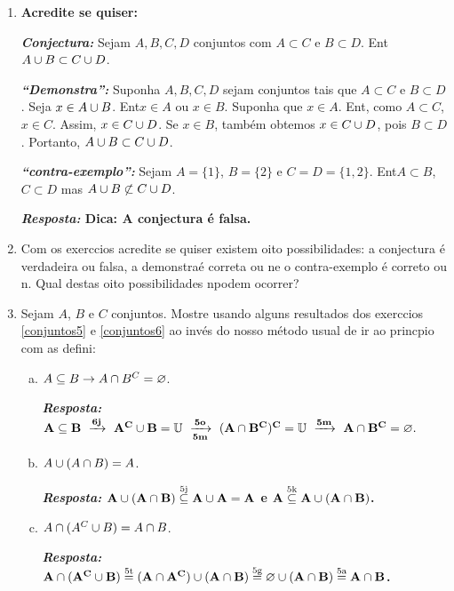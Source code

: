 \begin{enumerate}[{\bf 1.}]
\item {\bf Acredite se quiser:}  

\noindent \textit{\textbf{Conjectura:}} Sejam $A,B,C,D$ conjuntos com $A\subset C$ e $B\subset D$. Ent\ao $A\cup B \subset C\cup D$. 

\noindent \textit{\textbf{``Demonstra\caoi'':}} Suponha $A,B,C,D$ sejam conjuntos tais que $A\subset C$ e $B\subset D$. Seja $x\in A\cup B$. Ent\ao $x\in A$ ou $x\in B$. Suponha que $x\in A$. Ent\aoi, como $A\subset C$, $x\in C$. Assim, $x\in C\cup D$. Se $x\in B$, tamb\'em obtemos $x\in C\cup D$, pois $B\subset D$. Portanto, $A\cup B\subset C\cup D$.

\noindent \textit{\textbf{``contra-exemplo'':}} Sejam $A=\{1\}$, $B=\{2\}$ e $C=D=\{1,2\}$. Ent\ao $A\subset B$, $C\subset D$ mas $A\cup B \not\subset C\cup D$.

{\bf{\it Resposta:} Dica: A conjectura \'e falsa.}

\item Com os exerc\ih cios acredite se quiser existem oito possibilidades: a conjectura \'e verdadeira ou falsa, a demonstra\cao \'e correta ou n\ao e o contra-exemplo \'e correto ou n\aoi. Qual destas oito possibilidades n\ao podem ocorrer?

\item Sejam $A$, $B$ e $C$ conjuntos. Mostre usando alguns resultados dos exerc\ih cios \ref{conjuntos5} e \ref{conjuntos6} ao inv\'es do nosso m\'etodo usual de ir ao princ\ih pio com as defini\cois:
\begin{enumerate}[a)]
\item $A\subseteq B \to A\cap B^C=\varnothing$.

{\bf{\it Resposta:} ${\bf A\subseteq B \textrm{ }\xrightarrow[]{6j}\textrm{ } A^C\cup B=\mathbb{U} \textrm{ }\xrightarrow[5m]{5o}\textrm{ } (A\cap B^C)^C=\mathbb{U} \textrm{ }\xrightarrow[]{5m}\textrm{ } A\cap B^C=\varnothing.}$}

\item $A\cup(A\cap B)=A$.

{\bf{\it Resposta:} ${\bf A\cup(A\cap B)\stackrel{\text{5j}}{\subseteq}A\cup A=A}$ e ${\bf A\stackrel{\text{5k}}{\subseteq} A\cup(A\cap B)}$.}

\item $A\cap(A^C\cup B)=A\cap B$. 

{\bf{\it Resposta:} ${\bf A\cap(A^C\cup B)\stackrel{\text{5t}}{=}(A\cap A^C)\cup(A\cap B)\stackrel{\text{5g}}{=}\varnothing\cup(A\cap B)\stackrel{\text{5a}}{=}A\cap B}$.}


\end{enumerate}
\end{enumerate}
